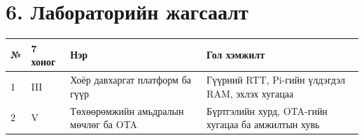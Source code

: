 \hypertarget{ux43bux430ux431ux43eux440ux430ux442ux43eux440ux438ux439ux43d-ux436ux430ux433ux441ux430ux430ux43bux442}{%
\section{6. Лабораторийн жагсаалт}\label{ux43bux430ux431ux43eux440ux430ux442ux43eux440ux438ux439ux43d-ux436ux430ux433ux441ux430ux430ux43bux442}}

\begingroup\scriptsize\begin{longtable}[]{@{}llll@{}}
\toprule
\begin{minipage}[b]{0.22\columnwidth}\raggedright
№\strut
\end{minipage} & \begin{minipage}[b]{0.22\columnwidth}\raggedright
7 хоног\strut
\end{minipage} & \begin{minipage}[b]{0.22\columnwidth}\raggedright
Нэр\strut
\end{minipage} & \begin{minipage}[b]{0.22\columnwidth}\raggedright
Гол хэмжилт\strut
\end{minipage}\tabularnewline
\midrule
\endhead
\begin{minipage}[t]{0.22\columnwidth}\raggedright
1\strut
\end{minipage} & \begin{minipage}[t]{0.22\columnwidth}\raggedright
III\strut
\end{minipage} & \begin{minipage}[t]{0.22\columnwidth}\raggedright
Хоёр давхаргат платформ ба гүүр\strut
\end{minipage} & \begin{minipage}[t]{0.22\columnwidth}\raggedright
Гүүрний RTT, Pi-гийн үлдэгдэл RAM, эхлэх хугацаа\strut
\end{minipage}\tabularnewline
\begin{minipage}[t]{0.22\columnwidth}\raggedright
2\strut
\end{minipage} & \begin{minipage}[t]{0.22\columnwidth}\raggedright
V\strut
\end{minipage} & \begin{minipage}[t]{0.22\columnwidth}\raggedright
Төхөөрөмжийн амьдралын мөчлөг ба OTA\strut
\end{minipage} & \begin{minipage}[t]{0.22\columnwidth}\raggedright
Бүртгэлийн хурд, OTA-гийн хугацаа ба амжилтын хувь\strut
\end{minipage}\tabularnewline

\end{longtable}
